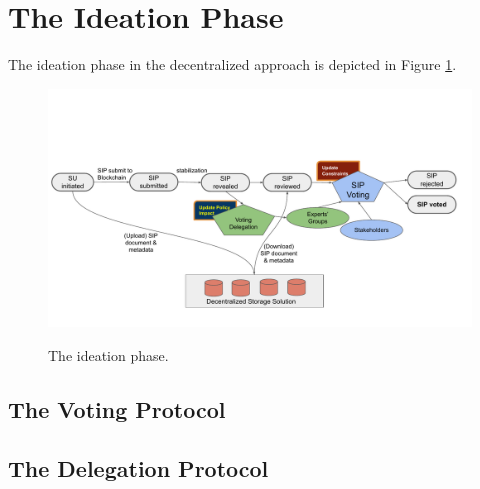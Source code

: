 \section{The Ideation Phase}
The ideation phase in the decentralized approach is depicted in Figure \ref{ideation}.

\begin{figure}[H]
    \caption{The ideation phase.}
    \centering
    \includegraphics[width=0.9 \columnwidth,keepaspectratio]{figures/ideation_phase.pdf}
    \label{ideation}
\end{figure}

\subsection{The Voting Protocol}

\subsection{The Delegation Protocol}